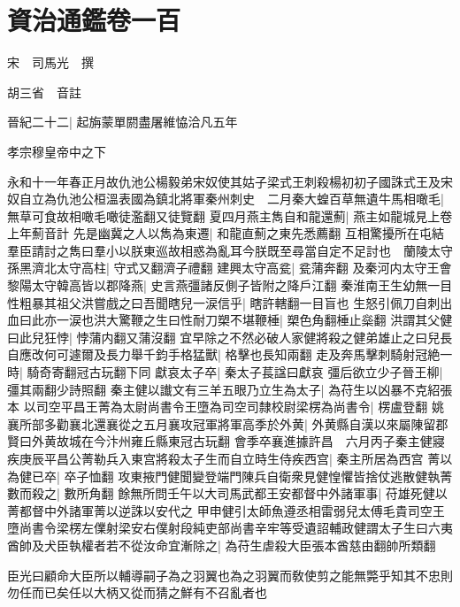 \chapter{資治通鑑卷一百}
宋　司馬光　撰

胡三省　音註

晉紀二十二|{
	起旃蒙單閼盡屠維恊洽凡五年}


孝宗穆皇帝中之下

永和十一年春正月故仇池公楊毅弟宋奴使其姑子梁式王刺殺楊初初子國誅式王及宋奴自立為仇池公桓溫表國為鎮北將軍秦州刺史　二月秦大蝗百草無遺牛馬相噉毛|{
	無草可食故相噉毛噉徒濫翻又徒覽翻}
夏四月燕主雋自和龍還薊|{
	燕主如龍城見上卷上年薊音計}
先是幽冀之人以雋為東遷|{
	和龍直薊之東先悉薦翻}
互相驚擾所在屯結羣臣請討之雋曰羣小以朕東巡故相惑為亂耳今朕既至尋當自定不足討也　蘭陵太守孫黑濟北太守高柱|{
	守式又翻濟子禮翻}
建興太守高瓫|{
	瓫蒲奔翻}
及秦河内太守王會黎陽太守韓高皆以郡降燕|{
	史言燕彊諸反側子皆附之降戶江翻}
秦淮南王生幼無一目性粗暴其祖父洪嘗戲之曰吾聞瞎兒一涙信乎|{
	瞎許轄翻一目盲也}
生怒引佩刀自刺出血曰此亦一涙也洪大驚鞭之生曰性耐刀槊不堪鞭棰|{
	槊色角翻棰止橤翻}
洪謂其父健曰此兒狂悖|{
	悖蒲内翻又蒲沒翻}
宜早除之不然必破人家健將殺之健弟雄止之曰兒長自應改何可遽爾及長力舉千鈞手格猛獸|{
	格擊也長知兩翻}
走及奔馬擊刺騎射冠絶一時|{
	騎奇寄翻冠古玩翻下同}
獻哀太子卒|{
	秦太子萇諡曰獻哀}
彊后欲立少子晉王柳|{
	彊其兩翻少詩照翻}
秦主健以䜟文有三羊五眼乃立生為太子|{
	為苻生以凶暴不克紹張本}
以司空平昌王菁為太尉尚書令王墮為司空司隸校尉梁楞為尚書令|{
	楞盧登翻}
姚襄所部多勸襄北還襄從之五月襄攻冠軍將軍高季於外黄|{
	外黄縣自漢以來屬陳留郡賢曰外黄故城在今汴州雍丘縣東冠古玩翻}
會季卒襄進據許昌　六月丙子秦主健寢疾庚辰平昌公菁勒兵入東宫將殺太子生而自立時生侍疾西宫|{
	秦主所居為西宫}
菁以為健已卒|{
	卒子恤翻}
攻東掖門健聞變登端門陳兵自衛衆見健惶懼皆捨仗逃散健執菁數而殺之|{
	數所角翻}
餘無所問壬午以大司馬武都王安都督中外諸軍事|{
	苻雄死健以菁都督中外諸軍菁以逆誅以安代之}
甲申健引太師魚遵丞相雷弱兒太傅毛貴司空王墮尚書令梁楞左㒒射梁安右僕射段純吏部尚書辛牢等受遺詔輔政健謂太子生曰六夷酋帥及犬臣執權者若不從汝命宜漸除之|{
	為苻生虐殺大臣張本酋慈由翻帥所類翻}


臣光曰顧命大臣所以輔導嗣子為之羽翼也為之羽翼而敎使剪之能無斃乎知其不忠則勿任而已矣任以大柄又從而猜之鮮有不召亂者也

